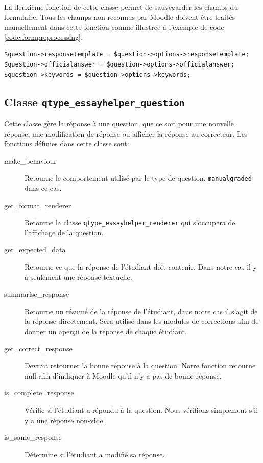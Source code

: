 La deuxi\`eme fonction de cette classe permet de sauvegarder les champs du formulaire.
Tous les champs non reconnus par Moodle doivent \^etre trait\'es manuellement dans cette fonction comme illustr\'ee \`a l'exemple de code \ref{code:formpreprocessing}.
\begin{lstfloat}
\begin{lstlisting}[frame=l]
$question->responsetemplate = $question->options->responsetemplate;
$question->officialanswer = $question->options->officialanswer;
$question->keywords = $question->options->keywords;
\end{lstlisting}
\caption{Extrait du code de la fonction data\_preprocessing de la classe qtype\_essayhelper\_edit\_form.}
\label{code:formpreprocessing}
\end{lstfloat}
\subsection*{Classe \texttt{qtype\_essayhelper\_question}}
Cette classe g\`ere la r\'eponse \`a une question, que ce soit pour une nouvelle r\'eponse, une modification de r\'eponse ou afficher la r\'eponse au correcteur.
Les fonctions d\'efinies dans cette classe sont:
\begin{description}
  \item[make\_behaviour] Retourne le comportement utilis\'e par le type de question. \texttt{manualgraded} dans ce cas.
  \item[get\_format\_renderer] Retourne la classe \texttt{qtype\_essayhelper\_renderer} qui s'occupera de l'affichage de la question.
  \item[get\_expected\_data] Retourne ce que la r\'eponse de l'\'etudiant doit contenir. Dans notre cas il y a seulement une r\'eponse textuelle.
  \item[summarise\_response] Retourne un r\'esum\'e de la r\'eponse de l'\'etudiant, dans notre cas il s'agit de la r\'eponse directement. Sera utilis\'e dans les modules de corrections afin de donner un aper\c{c}u de la r\'eponse de chaque \'etudiant.
  \item[get\_correct\_response] Devrait retourner la bonne r\'eponse \`a la question. Notre fonction retourne null afin d'indiquer \`a Moodle qu'il n'y a pas de bonne r\'eponse.
  \item[is\_complete\_response] V\'erifie si l'\'etudiant a r\'epondu \`a la question. Nous v\'erifions simplement s'il y a une r\'eponse non-vide.
  \item[is\_same\_response] D\'etermine si l'\'etudiant a modifi\'e sa r\'eponse.
\end{description}
